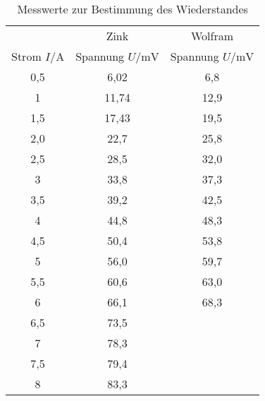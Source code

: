 \begin{table}
  \centering
  \caption{Messwerte zur Bestimmung des Wiederstandes }
  \label{tab:R}
  \begin{tabular}{c c c}
    \toprule
                       &     Zink                        & Wolfram\\
Strom $I/\si{\ampere}$ & Spannung $U/\si{\milli\volt}$  & Spannung $U/\si{\milli\volt}$ \\
    \midrule
    0,5   &  6,02  &  6,8\\
    1     &  11,74 &  12,9\\
    1,5   &  17,43 &  19,5\\
    2,0   &  22,7  &  25,8\\
    2,5   &  28,5  &  32,0\\
    3     &  33,8  &  37,3\\
    3,5   &  39,2  &  42,5\\
    4     &  44,8  &  48,3\\
    4,5   &  50,4  &  53,8\\
    5     &  56,0  &  59,7\\
    5,5   &  60,6  &  63,0\\
    6     &  66,1  &  68,3\\
    6,5   &  73,5  &\\
    7     &  78,3  &\\
    7,5   &  79,4  &\\
    8     &  83,3  &\\
   \bottomrule
  \end{tabular}
\end{table}
\FloatBarrier

